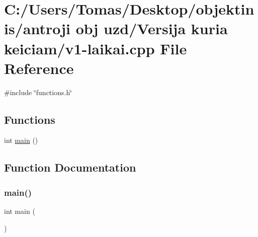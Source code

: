 \hypertarget{v1-laikai_8cpp}{}\section{C\+:/\+Users/\+Tomas/\+Desktop/objektinis/antroji obj uzd/\+Versija kuria keiciam/v1-\/laikai.cpp File Reference}
\label{v1-laikai_8cpp}
{\ttfamily \#include \char`\"{}functions.\+h\char`\"{}}\newline
\subsection*{Functions}
\begin{DoxyCompactItemize}
\item 
int \mbox{\hyperlink{v1-laikai_8cpp_ae66f6b31b5ad750f1fe042a706a4e3d4}{main}} ()
\end{DoxyCompactItemize}


\subsection{Function Documentation}
\mbox{\label{v1-laikai_8cpp_ae66f6b31b5ad750f1fe042a706a4e3d4}} 
\subsubsection{\texorpdfstring{main()}{main()}}
{\footnotesize\ttfamily int main (\begin{DoxyParamCaption}{ }\end{DoxyParamCaption})}


